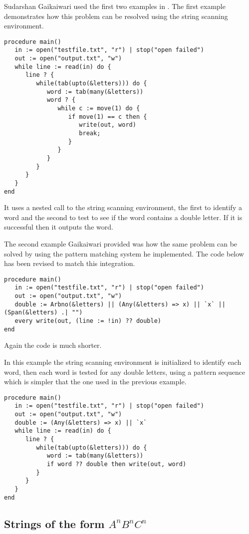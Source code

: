 \documentclass{article}
\begin{document}
Sudarshan Gaikaiwari used the first two examples in \cite{Gaikaiwari2005}.  The first example demonstrates how this problem can be resolved using the string scanning environment.
\begin{verbatim}
procedure main()
   in := open("testfile.txt", "r") | stop("open failed")
   out := open("output.txt", "w")
   while line := read(in) do {
      line ? {
         while(tab(upto(&letters))) do {
            word := tab(many(&letters))
            word ? {
               while c := move(1) do {
                  if move(1) == c then {
                     write(out, word)
                     break;
                  }
               }
            }
         }
      }
   }
end
\end{verbatim}
It uses a nested call to the string scanning environment, the first to identify a word and the second to test to see if the word contains a double letter.  If it is successful then it outputs the word.

The second example Gaikaiwari provided was how the same problem can be solved by using the pattern matching system he implemented.  The code below has been revised to match this integration.
\begin{verbatim}
procedure main()
   in := open("testfile.txt", "r") | stop("open failed")
   out := open("output.txt", "w")
   double := Arbno(&letters) || (Any(&letters) => x) || `x` || (Span(&letters) .| "")
   every write(out, (line := !in) ?? double)
end 
\end{verbatim}
Again the code is much shorter.

In this example the string scanning environment is initialized to identify each word, then each word is tested for any double letters, using a pattern sequence which is simpler that the one used in the previous example.
\begin{verbatim}
procedure main()
   in := open("testfile.txt", "r") | stop("open failed")
   out := open("output.txt", "w")
   double := (Any(&letters) => x) || `x` 
   while line := read(in) do {
      line ? {
         while(tab(upto(&letters))) do {
            word := tab(many(&letters))
            if word ?? double then write(out, word)
         }
      }
   }
end 
\end{verbatim}

\subsection{Strings of the form \emph{$A^nB^nC^n$}}
\end{document}
